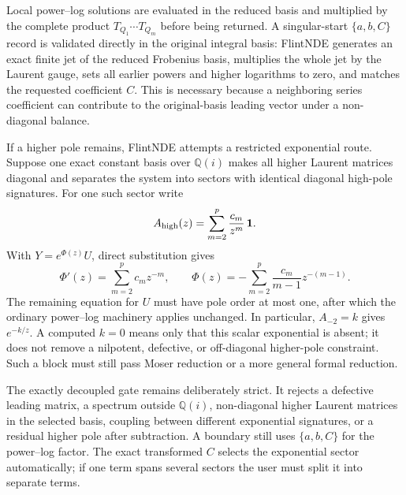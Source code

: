 \documentclass[11pt]{article}
\newcommand{\Id}{\mathbf 1}
\renewcommand{\_}{\origunderscore\allowbreak}
\begin{document}
Local power--log solutions are evaluated in the reduced basis and multiplied by the complete
product $T_{Q_1}\cdots T_{Q_m}$ before being returned.  A singular-start $\{a,b,C\}$ record is
validated directly in the original integral basis: FlintNDE generates an exact finite jet of
the reduced Frobenius basis, multiplies the whole jet by the Laurent gauge, sets all earlier
powers and higher logarithms to zero, and matches the requested coefficient $C$.  This is
necessary because a neighboring series coefficient can contribute to the original-basis
leading vector under a non-diagonal balance.

If a higher pole remains, FlintNDE attempts a restricted exponential route.  Suppose one
exact constant basis over $\mathbb Q(i)$ makes all higher Laurent matrices diagonal and
separates the system into sectors with identical diagonal high-pole signatures.  For one
such sector write
\begin{equation}
  A_{\rm high}(z)=\sum_{m=2}^{p}\frac{c_m}{z^m}\,\Id.
\end{equation}
With $Y=e^{\Phi(z)}U$, direct substitution gives
\begin{equation}
  \Phi'(z)=\sum_{m=2}^{p}c_m z^{-m},\qquad
  \Phi(z)=-\sum_{m=2}^{p}\frac{c_m}{m-1}z^{-(m-1)}.
  \label{eq:implemented-exponential-factor}
\end{equation}
The remaining equation for $U$ must have pole order at most one, after which the ordinary
power--log machinery applies unchanged.  In particular, $A_{-2}=k$ gives
$e^{-k/z}$.  A computed $k=0$ means only that this scalar exponential is absent; it does not
remove a nilpotent, defective, or off-diagonal higher-pole constraint.  Such a block must
still pass Moser reduction or a more general formal reduction.

The exactly decoupled gate remains deliberately strict.  It rejects a defective leading
matrix, a spectrum outside $\mathbb Q(i)$, non-diagonal higher Laurent matrices in the
selected basis, coupling between different exponential signatures, or a residual higher
pole after subtraction.  A boundary still uses $\{a,b,C\}$ for the power--log factor.  The
exact transformed $C$ selects the exponential sector automatically; if one term spans
several sectors the user must split it into separate terms.
\end{document}

